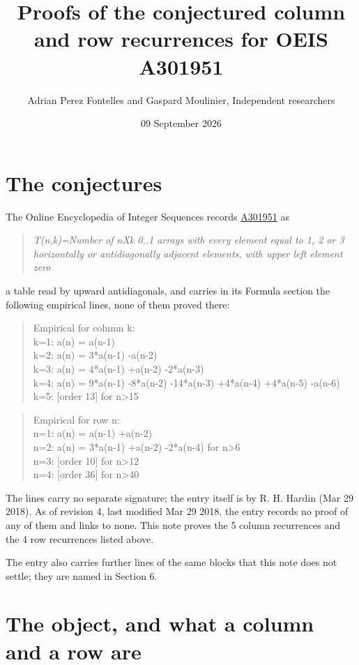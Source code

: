\documentclass[11pt]{article}
\title{Proofs of the conjectured column and row recurrences for OEIS A301951}
\author{Adrian Perez Fontelles and Gaspard Moulinier, Independent researchers}
\date{09 September 2026}
\theoremstyle{definition}
\begin{document}
\maketitle
\section{The conjectures}

The Online Encyclopedia of Integer Sequences records \href{https://oeis.org/A301951}{A301951} as

\begin{quote}\itshape T(n,k)=Number of nXk 0..1 arrays with every element equal to 1, 2 or 3 horizontally or antidiagonally adjacent elements, with upper left element zero\end{quote}

a table read by upward antidiagonals, and carries in its Formula section the following empirical lines, none of them proved there:

\begin{quote}\ttfamily Empirical for column k:\\
k=1: a(n) = a(n-1)\\k=2: a(n) = 3*a(n-1) -a(n-2)\\k=3: a(n) = 4*a(n-1) +a(n-2) -2*a(n-3)\\k=4: a(n) = 9*a(n-1) -8*a(n-2) -14*a(n-3) +4*a(n-4) +4*a(n-5) -a(n-6)\\k=5: [order 13] for n>15\end{quote}

\begin{quote}\ttfamily Empirical for row n:\\
n=1: a(n) = a(n-1) +a(n-2)\\n=2: a(n) = 3*a(n-1) +a(n-2) -2*a(n-4) for n>6\\n=3: [order 10] for n>12\\n=4: [order 36] for n>40\end{quote}

The lines carry no separate signature; the entry itself is by R. H. Hardin (Mar 29 2018). As of revision 4, last modified Mar 29 2018, the entry records no proof of any of them and links to none. This note proves the 5 column recurrences and the 4 row recurrences listed above.

The entry also carries further lines of the same blocks that this note does not settle; they are named in Section 6.

\section{The object, and what a column and a row are}
\end{document}
